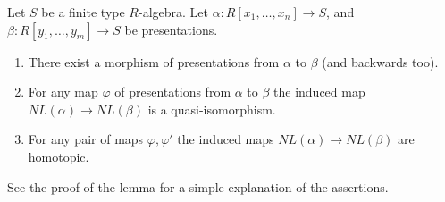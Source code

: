 \begin{lemma}
\label{lemma-NL-homotopy}
Let $S$ be a finite type $R$-algebra.
Let $\alpha : R[x_1, \ldots, x_n] \to S$, and
$\beta : R[y_1, \ldots, y_m] \to S$ be presentations.
\begin{enumerate}
\item There exist a morphism of presentations from $\alpha$
to $\beta$ (and backwards too).
\item For any map $\varphi$ of presentations from
$\alpha$ to $\beta$ the induced map $NL(\alpha) \to NL(\beta)$
is a quasi-isomorphism.
\item For any pair of maps $\varphi, \varphi'$ the induced maps
$NL(\alpha) \to NL(\beta)$ are homotopic.
\end{enumerate}
See the proof of the lemma for a simple explanation
of the assertions.
\end{lemma}

